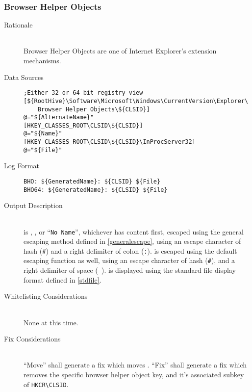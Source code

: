 \subsubsection{Browser Helper Objects}
\begin{description}
\item[Rationale] \hfill \\
Browser Helper Objects are one of Internet Explorer's extension mechanisms.
\item[Data Sources] \hfill
\vspace{-\baselineskip}
\begin{verbatim}
;Either 32 or 64 bit registry view
[${RootHive}\Software\Microsoft\Windows\CurrentVersion\Explorer\
    Browser Helper Objects\${CLSID}]
@="${AlternateName}"
[HKEY_CLASSES_ROOT\CLSID\${CLSID}]
@="${Name}"
[HKEY_CLASSES_ROOT\CLSID\${CLSID}\InProcServer32]
@="${File}"
\end{verbatim}
\item[Log Format] \hfill
\vspace{-\baselineskip}
\begin{verbatim}
BHO: ${GeneratedName}: ${CLSID} ${File}
BHO64: ${GeneratedName}: ${CLSID} ${File}
\end{verbatim}
\item[Output Description] \hfill \\
 is , , or ``\verb|No Name|'',
whichever has content first, escaped using the general escaping method defined
in \ref{generalescape}, using an escape character of hash (\verb|#|) and a right
delimiter of colon (\verb|:|). \var{CLSID} is escaped using the default escaping
function as well, using an escape character of hash (\verb|#|), and a right
delimiter of space (\verb| |). \var{File} is displayed using the standard file
display format defined in \ref{stdfile}.
\item[Whitelisting Considerations] \hfill \\
None at this time.
\item[Fix Considerations] \hfill \\
``Move'' shall generate a fix which moves . ``Fix'' shall generate a
fix which removes the specific browser helper object key, and it's associated
subkey of \verb|HKCR\CLSID|.
\end{description}

